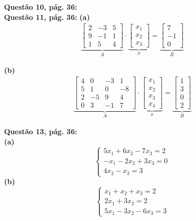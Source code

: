 \documentclass[a4paper,12pt]{article}
\begin{document}
\textbf{Questão 10, pág. 36:}\\

\textbf{Questão 11, pág. 36:}
\textbf{(a)}
\begin{align*}
    \underbrace{
    \begin{bmatrix}
        2 & -3 & 5\\
        9 & -1 & 1\\
        1 & 5 & 4
    \end{bmatrix}}_{A} 
    \cdot
    \underbrace{
    \begin{bmatrix}
        x_{1} \\
        x_{2} \\
        x_{3}
    \end{bmatrix}}_{x}
    =
    \underbrace{
    \begin{bmatrix}
        7 \\
        -1 \\
        0
    \end{bmatrix}}_{B}
\end{align*}

\textbf{(b)}
\begin{align*}
    \underbrace{
    \begin{bmatrix}
        4 & 0 & -3 & 1\\
        5 & 1 & 0 & -8\\
        2 & -5 & 9 & 4\\
        0 & 3 & -1 & 7
    \end{bmatrix}}_{A} 
    \cdot
    \underbrace{
    \begin{bmatrix}
        x_{1} \\
        x_{2} \\
        x_{3} \\
        x_{4}
    \end{bmatrix}}_{x}
    =
    \underbrace{
    \begin{bmatrix}
        1 \\
        3 \\
        0 \\
        2
    \end{bmatrix}}_{B}
\end{align*}

\textbf{Questão 13, pág. 36:}\\
\textbf{(a)}
\begin{equation*}
    \begin{cases*}
        5x_1 + 6x_2 - 7x_3 = 2 \\
        -x_1 - 2x_2 + 3x_3 = 0 \\
               4x_2 - x_ 3 = 3
    \end{cases*}
\end{equation*}
\textbf{(b)}
\begin{equation*}
    \begin{cases*}
         x_1 +  x_2 +  x_3 = 2 \\
        2x_1 + 3x_2        = 2 \\
        5x_1 - 3x_2 - 6x_3 = 3
    \end{cases*}
\end{equation*}
\end{document}
